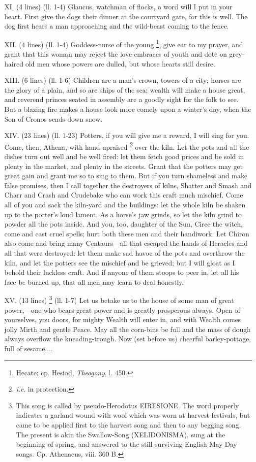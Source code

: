 XI. (4 lines) (ll. 1-4) Glaucus, watchman of flocks, a word will I put in your
heart. First give the dogs their dinner at the courtyard gate, for this is
well. The dog first hears a man approaching and the wild-beast coming to the
fence.

XII. (4 lines) (ll. 1-4) Goddess-nurse of the young \footnote{Hecate: cp. Hesiod,
\emph{Theogony}, l. 450.}, give ear
to my prayer, and grant that this woman may reject the love-embraces of youth
and dote on grey-haired old men whose powers are dulled, but whose hearts still
desire.

XIII. (6 lines) (ll. 1-6) Children are a man’s crown, towers of a city;
horses are the glory of a plain, and so are ships of the sea; wealth will make
a house great, and reverend princes seated in assembly are a goodly sight for
the folk to see. But a blazing fire makes a house look more comely upon a
winter’s day, when the Son of Cronos sends down snow.

XIV. (23 lines) (ll. 1-23) Potters, if you will give me a reward, I will sing
for you. Come, then, Athena, with hand upraised \footnote{\emph{i.e.} in
protection.} over the
kiln. Let the pots and all the dishes turn out well and be well fired: let them
fetch good prices and be sold in plenty in the market, and plenty in the
streets. Grant that the potters may get great gain and grant me so to sing to
them. But if you turn shameless and make false promises, then I call together
the destroyers of kilns, Shatter and Smash and Charr and Crash and Crudebake
who can work this craft much mischief. Come all of you and sack the kiln-yard
and the buildings: let the whole kiln be shaken up to the potter’s loud
lament. As a horse’s jaw grinds, so let the kiln grind to powder all the
pots inside. And you, too, daughter of the Sun, Circe the witch, come and cast
cruel spells; hurt both these men and their handiwork. Let Chiron also come and
bring many Centaurs—all that escaped the hands of Heracles and all that
were destroyed: let them make sad havoc of the pots and overthrow the kiln, and
let the potters see the mischief and be grieved; but I will gloat as I behold
their luckless craft. And if anyone of them stoops to peer in, let all his face
be burned up, that all men may learn to deal honestly.

XV. (13 lines) \footnote{This song is called by
pseudo-Herodotus EIRESIONE. The word properly indicates a garland wound with
wool which was worn at harvest-festivals, but came to be applied first to the
harvest song and then to any begging song. The present is akin the Swallow-Song
(XELIDONISMA), sung at the beginning of spring, and answered to the still
surviving English May-Day songs. Cp. Athenaeus, viii. 360 B.} (ll. 1-7) Let us betake us to the
house of some man of great power,—one who bears great power and is
greatly prosperous always. Open of yourselves, you doors, for mighty Wealth
will enter in, and with Wealth comes jolly Mirth and gentle Peace. May all the
corn-bins be full and the mass of dough always overflow the kneading-trough.
Now (set before us) cheerful barley-pottage, full of sesame....

